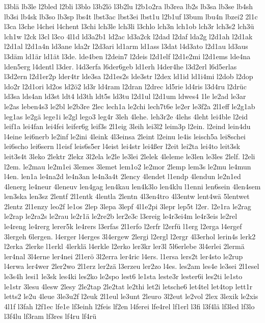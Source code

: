 {l3blä
lb3le
l2bled
l2bli
l3blo
l3b2lö
l3b2lu
l2b1o2ra
lb3rea
lb2s
lb3sa
lb3se
lb4sh
lb3si
lb4sk
lb3so
lb3sp
lbs4t
lbst3ac
lbst3ei
lbst1u
l2b1uf
l3bum
lbu4n
lbzei2
2l1c
l3ca
l3che
l4chei
l4chent
l3chi
lch3le
lch3li
l3chlo
lch3n
lch1ob
lch3r
lch3s2
lch3ü
lch1w
l2ck
l3cl
l3co
4l1d
ld3a2b1
ld2ac
ld3a2ck
l2dad
l2daf
lda2g
l2d1ah
l2d1ak
l2d1al
l2d1a4n
ld3ane
lda2r
l2d3ari
ld1arm
ld1ass
l3dat
l4d3ato
l2d1au
ld3aus
l3däm
ld1är
ld1ät
l3de.
lde4ben
l2dein7
l2deis
l2d1elf
l2d1e2mi
l2d1ems
lde4na
lden5erg
l4dentl
l3der.
l4d3erfa
l6der6geb
ld1erh
l4der4he
l3d2erl
l6d5erlas
l3d2ern
l2d1er2p
lder4tr
lde3sa
l2d1es2s
lde3str
l2dex
ld1id
ld1i4mi
l2dob
l2dop
ldo2r
l2d1ori
ld2os
ld2ö2
ld3r
ld4ram
l2dran
l2drec
ld5rie
ld4ris
l3d4ru
l2drüc
ld3sa
lds4an
ld3st
ldt4
ld3th
ldt5s
ld3tu
l2d1ul
l2d1um
ldwes4
1le
le2ad
le3ar
le2as
leben4s3
le2bl
le2b3re
2lec
lech1a
le2chi
lech7t6e
le2er
le3f2a
2l1eff
le2g1ab
leg1as
le2gä
lege1i
le2gl
lego3
leg4r
3leh
4lehe.
leh3r2e
4lehs
4leht
lei4ble
l2eid
leif1a
lei4fan
lei4fei
leifer6g
leif3s
2l1eig
3leih
lei3l2
leim3p
l2ein.
l2eind
lein4du
l4eine
lei6nerb
le2inf
le2ini
4leink
4l3einsa
2leint
l2einu
le4is
leisch5a
lei8schei
lei6scho
lei6sern
l1eisf
leis6s5er
l4eist
lei4str
lei4ßer
l2eit
lei2ta
lei4to
leit3sk
leit3s4t
3leko
2lektr
2lekz
3l2ela
le2le
le3lei
2lelek
4leleme
le3len
le3les
2lelf.
l2eli
l2em.
le2mau
le2m1ei
3lemes
3lemet
lem1o2
le2mor
2lemp
lem3s
le2mu
le4mun
l4en.
len1a
le4na2d
le4n3an
le4n3a4t
2lency
4lendet
l1endp
4lendun
le2n1ed
4lenerg
le4neur
4leneuv
len4gag
len4kau
len4k3lo
len4klu
l1enni
len6sein
4len4sem
len3ska
len3sz
2lentf
2l1entk
4lentla
2lentn
4l3en4tro
4l3entw
lent4wä
5lentwet
2lentz
2l1enzy
leo2f
le1os
2lep
3lepa
3lepf
4l1e2pi
3lepr
lep5t
l2er.
l2e1ra
le2rag
le2rap
le2ra2s
le2rau
le2r1ä
le2re2b
ler2e3c
l3ereig
le4r3ei4m
le4r3eis
le2rel
le4reng
le4rerg
lerer5k
le4rers
l3erfas
2l1erfo
l2erfr
l2erfü
l1erg
l2erga
l4ergef
3lergeh
6lergen.
l4erger
l4erges
3l4ergew
2lergi
l2ergl
l2ergr
4l3erhol
lerin4s
lerk2
l2erka
2lerke
l1erkl
4lerklä
l4erkle
l2erko
ler3kr
ler3l
5l6erlebe
3l4erlei
2lermä
ler4nal
3l4erne
ler4nei
2l1erö
3l2erra
ler4ric
l4ers.
l1ersa
lers2t
ler4sto
le2rup
l4erwa
ler4wer
2ler2wo
2l1erz
ler2zä
l3erzeu
ler2zo
l4es.
les2am
les4e
le3sei
2l1esel
le3s4h
lesi1
le3sk
les4ki
les2ko
le2spo
lest6
le1sta
leste3r
lester6i
les2ti
le1sto
le1str
3lesu
4lesw
2lesy
2le2tap
2le2tat
le2thi
let2i
letsche6
let4tel
let4top
lett1r
letts2
le2u
4leue
3le3u2f
l2euk
2l1eul
le3unt
2leuro
3l2eut
le2vol
2lex
3lexik
le2xis
4l1f
l3fah
l2f1ec
lfe1e
lf3einh
l2feis
lf2en
l4ferei
lfe4rel
lf1erl
l3fi
l3f4lä
lf3led
lf3lo
l3f4lu
lf3ram
lf3res
lf4ru
lf4rü
}
